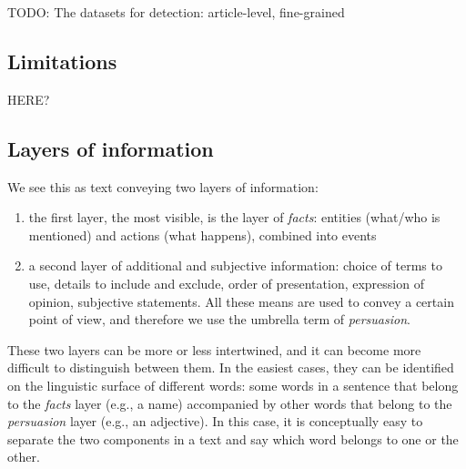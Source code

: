 
TODO: The datasets for detection: article-level, fine-grained

\subsection{\statusred Limitations}
HERE?

\subsection{\statusgreen Layers of information}
\label{ssec:lit_layers_of_info}
We see this as text conveying two layers of information:
\begin{enumerate}
    \item the first layer, the most visible, is the layer of \emph{facts}: entities (what/who is mentioned) and actions (what happens), combined into events
    \item a second layer of additional and subjective information: choice of terms to use, details to include and exclude, order of presentation, expression of opinion, subjective statements. All these means are used to convey a certain point of view, and therefore we use the umbrella term of \emph{persuasion}.
\end{enumerate}



These two layers can be more or less intertwined, and it can become more difficult to distinguish between them.
In the easiest cases, they can be identified on the linguistic surface of different words: some words in a sentence that belong to the \emph{facts} layer (e.g., a name) accompanied by other words that belong to the \emph{persuasion} layer (e.g., an adjective).
In this case, it is conceptually easy to separate the two components in a text and say which word belongs to one or the other.

